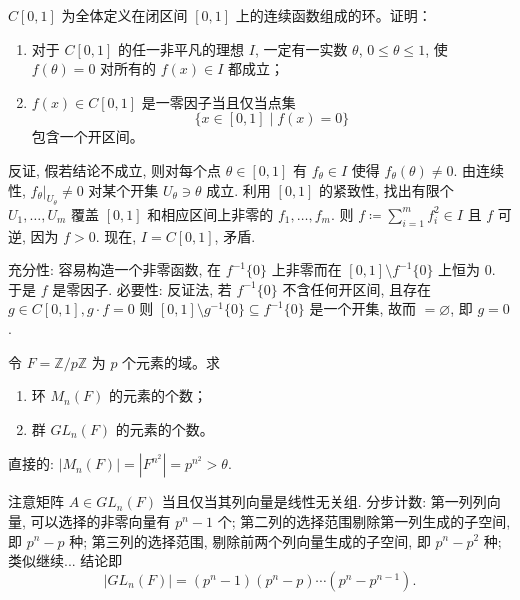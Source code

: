 \setcounter{pb}{43}

\begin{problem}
    $C[0,1]$ 为全体定义在闭区间 $[0,1]$ 上的连续函数组成的环。证明：

\begin{enumerate}[label=(\roman*)]
    \item 对于 $ C[0,1] $ 的任一非平凡的理想 $ I $, 一定有一实数 $ \theta $, $ 0 \leq \theta \leq 1 $, 使 $ f(\theta) = 0 $ 对所有的 $ f(x) \in I $ 都成立；
    \item $ f(x) \in C[0,1] $ 是一零因子当且仅当点集
    \[
    \{ x \in [0,1] \mid f(x) = 0 \}
    \]
    包含一个开区间。
\end{enumerate}

\end{problem}

\begin{solution}
    反证, 假若结论不成立, 则对每个点 $\theta\in[0,1]$ 有 $f_{\theta}\in I$ 使得 $f_{\theta}(\theta)\ne0$. 
    由连续性, $\left.{f_{\theta}}\right|_{U_{\theta}}^{}\ne0$ 对某个开集 $U_{\theta}\ni\theta$ 成立. 
    利用 $[0,1]$ 的紧致性, 找出有限个 $U_{1},\dots,U_{m}$ 覆盖 $[0,1]$ 和相应区间上非零的 $f_{1},\dots,f_{m}$. 
    则 $f \coloneqq \sum_{i=1}^{m}f_{i}^{2}\in I$ 且 $f$ 可逆, 因为 $f>0$. 
    现在, $I=C[0,1]$, 矛盾. 
    \par 充分性: 容易构造一个非零函数, 在 $f^{-1}\{0\}$ 上非零而在 $[0,1]\setminus f^{-1}\{0\}$ 上恒为 $0$. 
    于是 $f$ 是零因子.
    必要性: 反证法, 若 $f^{-1}\{0\}$ 不含任何开区间, 且存在 $g\in C[0,1], g\cdot f=0$ 则 $[0,1]\setminus g^{-1}\{0\}\subseteq f^{-1}\{0\}$ 
    是一个开集, 故而 $=\varnothing$, 即 $g=0$.
\end{solution}

\begin{problem}
    令 $ F = \mathbb{Z}/p\mathbb{Z} $ 为 $ p $ 个元素的域。求
    \begin{enumerate}[label=(\roman*)]
        \item 环 $ M_n(F) $ 的元素的个数；
        \item 群 $ GL_n(F) $ 的元素的个数。
    \end{enumerate}
\end{problem}

\begin{solution}
    直接的: $|M_{n}(F)|=|F^{n^{2}}|=p^{n^{2}}>\theta$. 
    \par 注意矩阵 $A\in GL_{n}(F)$ 当且仅当其列向量是线性无关组. 分步计数: 第一列列向量, 可以选择的非零向量有 $p^{n}-1$ 个; 
    第二列的选择范围剔除第一列生成的子空间, 即 $p^{n}-p$ 种; 第三列的选择范围, 剔除前两个列向量生成的子空间, 即 $p^{n}-p^{2}$ 种; 
    类似继续... 结论即
        \[
            |GL_{n}(F)|=(p^{n}-1)(p^{n}-p)\cdots(p^{n}-p^{n-1}).
        \]
\end{solution}

